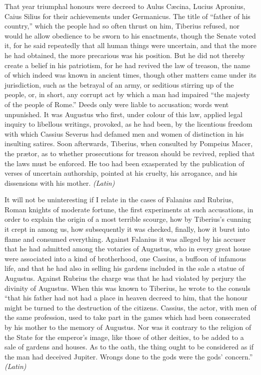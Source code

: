 
That year triumphal honours were decreed to Aulus Cæcina, Lucius Apronius, Caius Silius for their achievements under Germanicus. The title of ``father of his country,'' which the people had so often thrust on him, Tiberius refused, nor would he allow obedience to be sworn to his enactments, though the Senate voted it, for he said repeatedly that all human things were uncertain, and that the more he had obtained, the more precarious was his position. But he did not thereby create a belief in his patriotism, for he had revived the law of treason, the name of which indeed was known in ancient times, though other matters came under its jurisdiction, such as the betrayal of an army, or seditious stirring up of the people, or, in short, any corrupt act by which a man had impaired ``the majesty of the people of Rome.'' Deeds only were liable to accusation; words went unpunished. It was Augustus who first, under colour of this law, applied legal inquiry to libellous writings, provoked, as he had been, by the licentious freedom with which Cassius Severus had defamed men and women of distinction in his insulting satires. Soon afterwards, Tiberius, when consulted by Pompeius Macer, the prætor, as to whether prosecutions for treason should be revived, replied that the laws must be enforced. He too had been exasperated by the publication of verses of uncertain authorship, pointed at his cruelty, his arrogance, and his dissensions with his mother. \emph{(Latin)}


It will not be uninteresting if I relate in the cases of Falanius and Rubrius, Roman knights of moderate fortune, the first experiments at such accusations, in order to explain the origin of a most terrible scourge, how by Tiberius's cunning it crept in among us, how subsequently it was checked, finally, how it burst into flame and consumed everything. Against Falanius it was alleged by his accuser that he had admitted among the votaries of Augustus, who in every great house were associated into a kind of brotherhood, one Cassius, a buffoon of infamous life, and that he had also in selling his gardens included in the sale a statue of Augustus. Against Rubrius the charge was that he had violated by perjury the divinity of Augustus. When this was known to Tiberius, he wrote to the consuls ``that his father had not had a place in heaven decreed to him, that the honour might be turned to the destruction of the citizens. Cassius, the actor, with men of the same profession, used to take part in the games which had been consecrated by his mother to the memory of Augustus. Nor was it contrary to the religion of the State for the emperor's image, like those of other deities, to be added to a sale of gardens and houses. As to the oath, the thing ought to be considered as if the man had deceived Jupiter. Wrongs done to the gods were the gods' concern.'' \emph{(Latin)}

